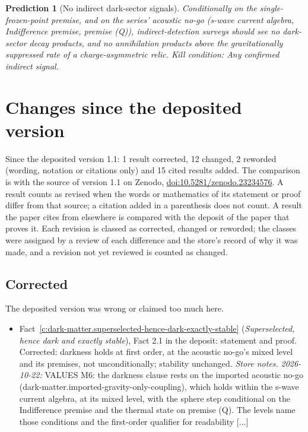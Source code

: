 \documentclass[11pt]{article}
\newtheorem{prediction}[theorem]{Prediction}
\theoremstyle{definition}
\theoremstyle{plain}
\begin{document}
\begin{prediction}[No indirect dark-sector signals]\label{c:pred.no-indirect-dark-signals}
Conditionally on the single-frozen-point premise, and on the series' acoustic no-go (s-wave current algebra, Indifference premise, premise (Q)), indirect-detection surveys should see no dark-sector decay products, and no annihilation products above the gravitationally suppressed rate of a charge-asymmetric relic.
\emph{Kill condition:} Any confirmed indirect signal.
\end{prediction}

\section*{Changes since the deposited version}
Since the deposited version 1.1: 1 result corrected, 12 changed, 2 reworded (wording, notation or citations only) and 15 cited results added. The comparison is with the source of version 1.1 on Zenodo, \href{https://doi.org/10.5281/zenodo.23234576}{doi:10.5281/zenodo.23234576}. A result counts as revised when the words or mathematics of its statement or proof differ from that source; a citation added in a parenthesis does not count. A result the paper cites from elsewhere is compared with the deposit of the paper that proves it. Each revision is classed as corrected, changed or reworded; the classes were assigned by a review of each difference and the store's record of why it was made, and a revision not yet reviewed is counted as changed.
\subsection*{Corrected}
The deposited version was wrong or claimed too much here.
\begin{itemize}\setlength{\itemsep}{2pt}
\item Fact~\ref{c:dark-matter.superselected-hence-dark-exactly-stable} (\emph{Superselected, hence dark and exactly stable}), Fact 2.1 in the deposit: statement and proof. Corrected: darkness holds at first order, at the acoustic no-go's mixed level and its premises, not unconditionally; stability unchanged. \emph{Store notes.} \emph{2026-10-22:} VALUES M6: the darkness clause rests on the imported acoustic no-go (dark-matter.imported-gravity-only-coupling), which holds within the s-wave current algebra, at its mixed level, with the sphere step conditional on the Indifference premise and the thermal state on premise (Q). The levels name those conditions and the first-order qualifier for readability [...]
\end{itemize}
\end{document}
